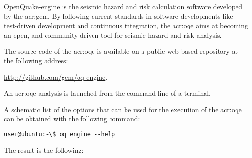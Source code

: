 OpenQuake-engine is the seismic hazard and risk calculation software developed by
the \glsdesc{acr:gem}. By following current standards in software
developments like test-driven development and continuous integration, the
\glsdesc{acr:oqe} aims at becoming an open, and community-driven tool for
seismic hazard and risk analysis.

The source code of the \glsdesc{acr:oqe} is available on a public web-based
repository at the following address:

\href{http://github.com/gem/oq-engine}{http://github.com/gem/oq-engine}.


An \gls{acr:oqe} analysis is launched from the command line of a terminal.

A schematic list of the options that can be used for the execution of the
\gls{acr:oqe} can be obtained with the following command:

\begin{verbatim}
user@ubuntu:~\$ oq engine --help
\end{verbatim}

The result is the following:

\inputminted[firstline=1,fontsize=\footnotesize,frame=single]{shell-session}{oqum/help.txt}
